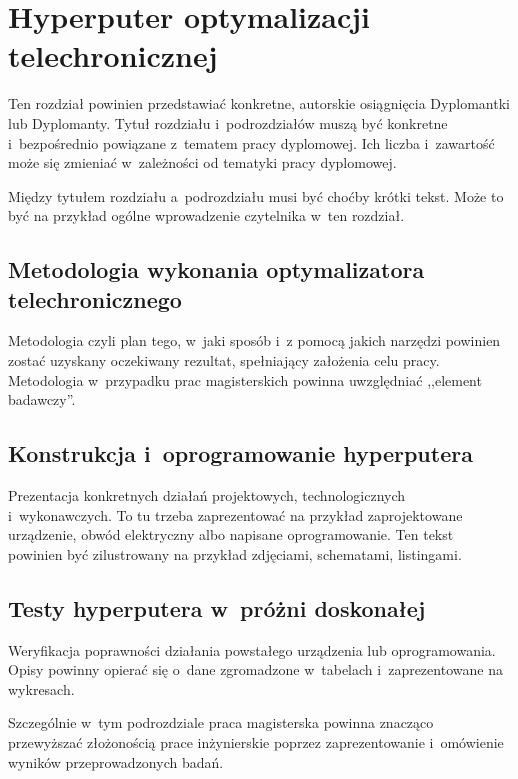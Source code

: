 \chapter{Hyperputer optymalizacji telechronicznej}

Ten rozdział powinien przedstawiać konkretne, autorskie osiągnięcia Dyplomantki lub Dyplomanty. Tytuł rozdziału i~podrozdziałów muszą być konkretne i~bezpośrednio powiązane z~tematem pracy dyplomowej. Ich liczba i~zawartość może się zmieniać w~zależności od tematyki pracy dyplomowej.

Między tytułem rozdziału a~podrozdziału musi być choćby krótki tekst. Może to być na przykład ogólne wprowadzenie czytelnika w~ten rozdział.

\section{Metodologia wykonania optymalizatora telechronicznego}

Metodologia czyli plan tego, w~jaki sposób i~z pomocą jakich narzędzi powinien zostać uzyskany oczekiwany rezultat, spełniający założenia celu pracy. Metodologia w~przypadku prac magisterskich powinna uwzględniać ,,element badawczy''.

\section{Konstrukcja i~oprogramowanie hyperputera}

Prezentacja konkretnych działań projektowych, technologicznych i~wykonawczych. To tu trzeba zaprezentować na przykład zaprojektowane urządzenie, obwód elektryczny albo napisane oprogramowanie. Ten tekst powinien być zilustrowany na przykład zdjęciami, schematami, listingami.

\section{Testy hyperputera w~próżni doskonałej}

Weryfikacja poprawności działania powstałego urządzenia lub oprogramowania. Opisy powinny opierać się o~dane zgromadzone w~tabelach i~zaprezentowane na wykresach.

Szczególnie w~tym podrozdziale praca magisterska powinna znacząco przewyższać złożonością prace inżynierskie poprzez zaprezentowanie i~omówienie wyników przeprowadzonych badań.
